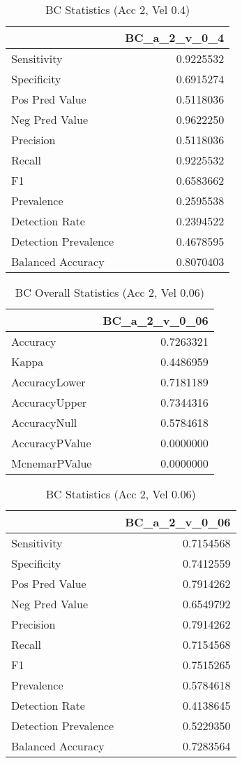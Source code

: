 \documentclass[]{article}
\begin{document}
\begin{table}[!h]

\caption{\label{tab:bc_accuracy_chunk}BC Statistics (Acc 2, Vel 0.4)}
\centering
\begin{tabular}[t]{lr}
\toprule
  & BC\_a\_2\_v\_0\_4\\
\midrule
Sensitivity & 0.9225532\\
Specificity & 0.6915274\\
Pos Pred Value & 0.5118036\\
Neg Pred Value & 0.9622250\\
Precision & 0.5118036\\
\addlinespace
Recall & 0.9225532\\
F1 & 0.6583662\\
Prevalence & 0.2595538\\
Detection Rate & 0.2394522\\
Detection Prevalence & 0.4678595\\
Balanced Accuracy & 0.8070403\\
\bottomrule
\end{tabular}
\end{table}

\begin{table}[!h]

\caption{\label{tab:bc_accuracy_chunk}BC Overall Statistics (Acc 2, Vel 0.06)}
\centering
\begin{tabular}[t]{lr}
\toprule
  & BC\_a\_2\_v\_0\_06\\
\midrule
Accuracy & 0.7263321\\
Kappa & 0.4486959\\
AccuracyLower & 0.7181189\\
AccuracyUpper & 0.7344316\\
AccuracyNull & 0.5784618\\
\addlinespace
AccuracyPValue & 0.0000000\\
McnemarPValue & 0.0000000\\
\bottomrule
\end{tabular}
\end{table}

\begin{table}[!h]

\caption{\label{tab:bc_accuracy_chunk}BC Statistics (Acc 2, Vel 0.06)}
\centering
\begin{tabular}[t]{lr}
\toprule
  & BC\_a\_2\_v\_0\_06\\
\midrule
Sensitivity & 0.7154568\\
Specificity & 0.7412559\\
Pos Pred Value & 0.7914262\\
Neg Pred Value & 0.6549792\\
Precision & 0.7914262\\
\addlinespace
Recall & 0.7154568\\
F1 & 0.7515265\\
Prevalence & 0.5784618\\
Detection Rate & 0.4138645\\
Detection Prevalence & 0.5229350\\
Balanced Accuracy & 0.7283564\\
\bottomrule
\end{tabular}
\end{table}
\end{document}
